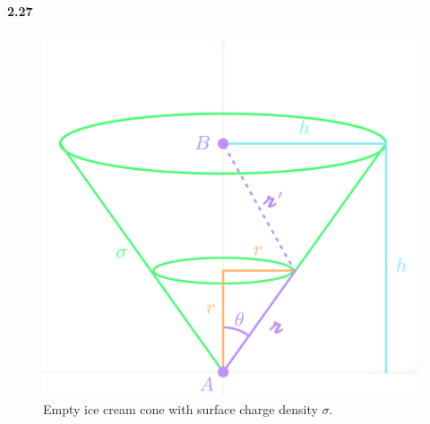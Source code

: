 \documentclass[../main.tex]{subfiles}
\begin{document}
\paragraph{2.27}
\begin{figure}[ht]
    \centering
    \includegraphics[width=0.5\linewidth]{images/hw2_26.png}
    \captionsetup{width=0.8\linewidth}
    \caption{Empty ice cream cone with surface charge density $\sigma$.}
    \label{fig:2_26}
\end{figure}
\end{document}
